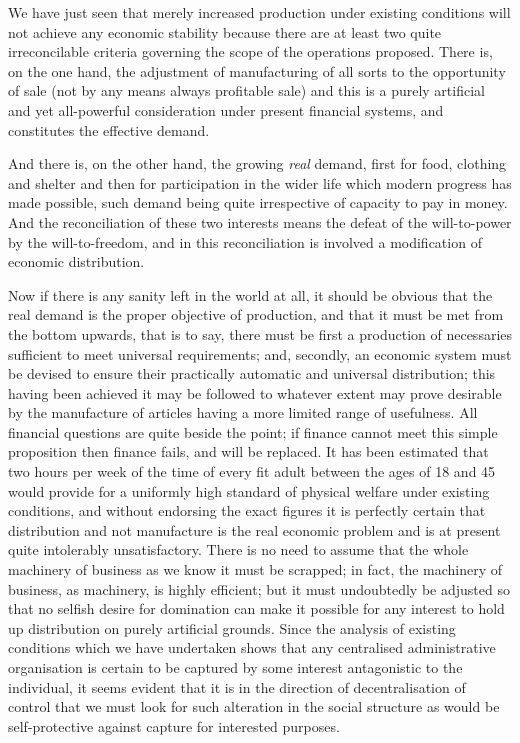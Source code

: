 \documentclass{book}
\begin{document}
We have just seen that merely increased production under existing conditions will not achieve any economic stability because there are at least two quite irreconcilable criteria governing the scope of the operations proposed. There is, on the one hand, the adjustment of manufacturing of all sorts to the opportunity of sale (not by any means always profitable sale) and this is a purely artificial and yet all-powerful consideration under present financial systems, and constitutes the effective demand.

And there is, on the other hand, the growing \emph{real} demand, first for food, clothing and shelter and then for participation in the wider life which modern progress has made possible, such demand being quite irrespective of capacity to pay in money. And the reconciliation of these two interests means the defeat of the will-to-power by the will-to-freedom, and in this reconciliation is involved a modification of economic distribution.

Now if there is any sanity left in the world at all, it should be obvious that the real demand is the proper objective of production, and that it must be met from the bottom upwards, that is to say, there must be first a production of necessaries sufficient to meet universal requirements; and, secondly, an economic system must be devised to ensure their practically automatic and universal distribution; this having been achieved it may be followed to whatever extent may prove desirable by the manufacture of articles having a more limited range of usefulness. All financial questions are quite beside the point; if finance cannot meet this simple proposition then finance fails, and will be replaced. It has been estimated that two hours per week of the time of every fit adult between the ages of 18 and 45 would provide for a uniformly high standard of physical welfare under existing conditions, and without endorsing the exact figures it is perfectly certain that distribution and not manufacture is the real economic problem and is at present quite intolerably unsatisfactory. There is no need to assume that the whole machinery of business as we know it must be scrapped; in fact, the machinery of business, as machinery, is highly efficient; but it must undoubtedly be adjusted so that no selfish desire for domination can make it possible for any interest to hold up distribution on purely artificial grounds. Since the analysis of existing conditions which we have undertaken shows that any centralised administrative organisation is certain to be captured by some interest antagonistic to the individual, it seems evident that it is in the direction of decentralisation of control that we must look for such alteration in the social structure as would be self-protective against capture for interested purposes.
\end{document}
